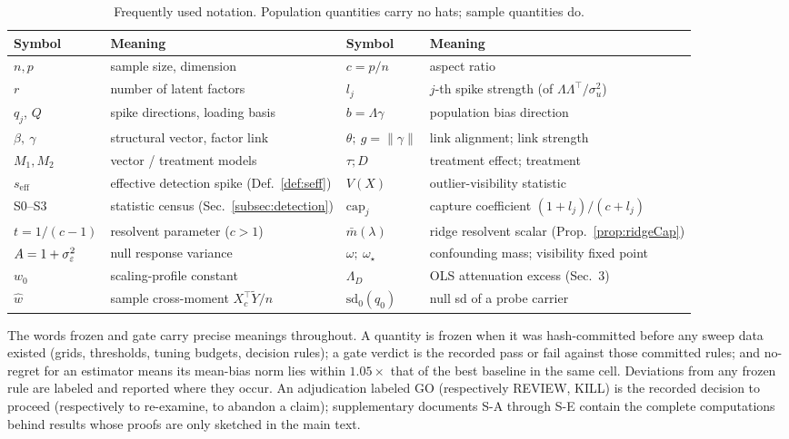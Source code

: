 \begin{table}[t]
\centering
\small
\begin{tabular}{ll@{\qquad}ll}
\toprule
Symbol & Meaning & Symbol & Meaning \\
\midrule
$n, p$ & sample size, dimension & $c=p/n$ & aspect ratio \\
$r$ & number of latent factors & $l_j$ & $j$-th spike strength (of $\Lambda\Lambda^\top/\sigma_u^2$) \\
$q_j$, $Q$ & spike directions, loading basis & $b=\Lambda\gamma$ & population bias direction \\
$\beta,\ \gamma$ & structural vector, factor link & $\theta;\ g=\|\gamma\|$ & link alignment; link strength \\
$M_1, M_2$ & vector / treatment models & $\tau; D$ & treatment effect; treatment \\
$s_{\mathrm{eff}}$ & effective detection spike (Def.~\ref{def:seff}) & $V(X)$ & outlier-visibility statistic \\
S0--S3 & statistic census (Sec.~\ref{subsec:detection}) & $\mathrm{cap}_j$ & capture coefficient $(1+l_j)/(c+l_j)$ \\
$t=1/(c-1)$ & resolvent parameter ($c>1$) & $\bar m(\lambda)$ & ridge resolvent scalar (Prop.~\ref{prop:ridgeCap}) \\
$A=1+\sigma_\varepsilon^2$ & null response variance & $\omega;\ \omega_\star$ & confounding mass; visibility fixed point \\
$w_0$ & scaling-profile constant & $\Lambda_D$ & OLS attenuation excess (Sec.~3) \\
$\hat w$ & sample cross-moment $X_c^\top\tilde Y/n$ & $\mathrm{sd}_0(q_0)$ & null sd of a probe carrier \\
\bottomrule
\end{tabular}
\caption{Frequently used notation. Population quantities carry no hats; sample quantities do.}
\label{tab:notation}
\end{table}



\begin{remark}
\label{rem:vocab}
The words frozen and gate carry precise meanings throughout. A quantity is frozen when it was hash-committed before any sweep data existed (grids, thresholds, tuning budgets, decision rules); a gate verdict is the recorded pass or fail against those committed rules; and no-regret for an estimator means its mean-bias norm lies within $1.05\times$ that of the best baseline in the same cell. Deviations from any frozen rule are labeled and reported where they occur. An adjudication labeled GO (respectively REVIEW, KILL) is the recorded decision to proceed (respectively to re-examine, to abandon a claim); supplementary documents S-A through S-E contain the complete computations behind results whose proofs are only sketched in the main text.
\end{remark}
